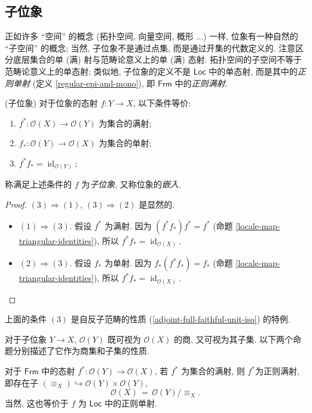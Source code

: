 \subsection{子位象}

正如许多 ``空间'' 的概念 (拓扑空间, 向量空间, 概形 ...) 一样, 位象有一种自然的 ``子空间'' 的概念; 当然, 子位象不是通过点集, 而是通过开集的代数定义的. 注意区分底层集合的单 (满) 射与范畴论意义上的单 (满) 态射. 拓扑空间的子空间不等于范畴论意义上的单态射; 类似地, 子位象的定义不是 $\mathsf {Loc}$ 中的单态射, 而是其中的\emph{正则单射} (定义 \ref{regular-epi-and-mono}), 即 $\mathsf {Frm}$ 中的\emph{正则满射}.

\begin{propdef}
	[label={sublocales}]
	{(子位象)}
	对于位象的态射 $f\colon Y\to X$, 以下条件等价:
	\begin{enumerate}
		[(1)]
		\item $f^*\colon \mathcal O(X)\to\mathcal O(Y)$ 为集合的满射;
		\item $f_*\colon \mathcal O(Y)\to\mathcal O(X)$ 为集合的单射;
		\item $f^*f_* = \operatorname{id}_{\mathcal O(Y)}$;
	\end{enumerate}
	称满足上述条件的 $f$ 为\emph{子位象}, 又称位象的\emph{嵌入}.
\end{propdef}
\begin{proof}
	$(3)\Rightarrow (1)$, $(3)\Rightarrow (2)$ 是显然的.
	\begin{itemize}
		\item $(1)\Rightarrow (3)$. 假设 $f^*$ 为满射. 因为 $(f^*f_*)f^* = f^*$ (命题 \ref{locale-map-triangular-identities}), 所以 $f^*f_*=\operatorname{id}_{\mathcal O(X)}$.
		\item $(2)\Rightarrow (3)$. 假设 $f_*$ 为单射. 因为 $f_*(f^*f_*) = f_*$ (命题 \ref{locale-map-triangular-identities}), 所以 $f^*f_*=\operatorname{id}_{\mathcal O(X)}$.
	\end{itemize}
\end{proof}

上面的条件 $(3)$ 是自反子范畴的性质 (\ref{adjoint-full-faithful-unit-iso}) 的特例.

对于子位象 $Y\to X$, $\mathcal O(Y)$ 既可视为 $\mathcal O(X)$ 的商, 又可视为其子集. 以下两个命题分别描述了它作为商集和子集的性质.


\begin{prop}
	{}
	对于 $\mathsf {Frm}$ 中的态射 $f^*\colon \mathcal O(Y)\to \mathcal O(X)$, 若 $f^*$ 为集合的满射, 则 $f^*$为正则满射, 即存在子\fm{} $(\equiv_X)\hookrightarrow \mathcal O(Y)\times\mathcal O(Y)$, $$\mathcal O(X) \,=\, \mathcal O(Y) \big/ \!\equiv_X.$$
	当然, 这也等价于 $f$ 为 $\mathsf {Loc}$ 中的正则单射.
\end{prop}

